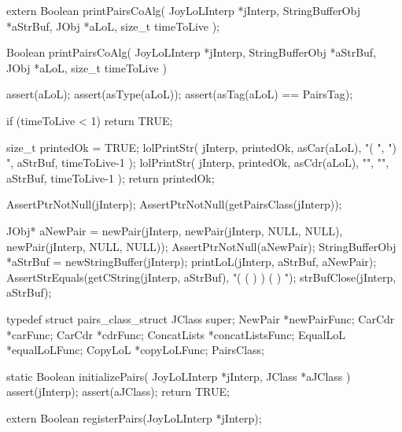 \startCHeader
extern Boolean printPairsCoAlg(
  JoyLoLInterp    *jInterp,
  StringBufferObj *aStrBuf,
  JObj            *aLoL,
  size_t           timeToLive
);
\stopCHeader
{}

\startCCode
Boolean printPairsCoAlg(
  JoyLoLInterp    *jInterp,
  StringBufferObj *aStrBuf,
  JObj            *aLoL,
  size_t           timeToLive
) {
  assert(aLoL);
  assert(asType(aLoL));
  assert(asTag(aLoL) == PairsTag);

  if (timeToLive < 1) return TRUE;
  
  size_t printedOk = TRUE;
  lolPrintStr(
    jInterp,
    printedOk,
    asCar(aLoL),
    "( ", ") ",
    aStrBuf,
    timeToLive-1
  );
  lolPrintStr(
    jInterp,
    printedOk,
    asCdr(aLoL),
    "",   "",
    aStrBuf,
    timeToLive-1
  );
  return printedOk;
}
\stopCCode


\startCTest
  AssertPtrNotNull(jInterp);
  AssertPtrNotNull(getPairsClass(jInterp));

  JObj* aNewPair = newPair(jInterp,
                               newPair(jInterp, NULL, NULL),
                               newPair(jInterp, NULL, NULL));
  AssertPtrNotNull(aNewPair);
  StringBufferObj *aStrBuf = newStringBuffer(jInterp);
  printLoL(jInterp, aStrBuf, aNewPair);
  AssertStrEquals(getCString(jInterp, aStrBuf), "( ( ) ) ( ) ");
  strBufClose(jInterp, aStrBuf);
\stopCTest
\stopTestCase
\stopTestSuite

\startTestSuite[registerPairs]

\startCHeader
typedef struct pairs_class_struct {
  JClass       super;
  NewPair     *newPairFunc;
  CarCdr      *carFunc;
  CarCdr      *cdrFunc;
  ConcatLists *concatListsFunc;
  EqualLoL    *equalLoLFunc;
  CopyLoL     *copyLoLFunc;
} PairsClass;
\stopCHeader

\startCCode
static Boolean initializePairs(
  JoyLoLInterp *jInterp,
  JClass   *aJClass
) {
  assert(jInterp);
  assert(aJClass);
  return TRUE;
}
\stopCCode

\startCHeader
extern Boolean registerPairs(JoyLoLInterp *jInterp);
\stopCHeader
{}


